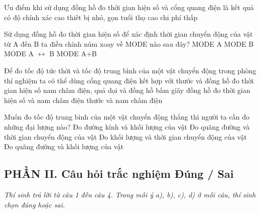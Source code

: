 \begin{ex} Ưu điểm khi sử dụng đồng hồ đo thời gian hiện số và cổng quang điện là
\choice
{\True kết quả có độ chính xác cao}
{thiết bị nhỏ, gọn}
{tuổi thọ cao}
{chi phí thấp}
\end{ex}

\begin{ex} Sử dụng đồng hồ đo thời gian hiện số để xác định thời gian chuyển động của vật từ A đến B ta điều chỉnh núm xoay về MODE nào sau đây?
\choice
{MODE A}
{MODE B}
{\True MODE A $\leftrightarrow$ B}
{MODE A+B}
\end{ex}

\begin{ex} Để đo tốc độ tức thời và tốc độ trung bình của một vật chuyển động trong phòng thí nghiệm ta có thể dùng cổng quang điện kết hợp với
\choice
{\True thước và đồng hồ đo thời gian hiện số}
{nam châm điện, quả dọi và đồng hồ bấm giây}
{đồng hồ đo thời gian hiện số và nam châm điện}
{thước và nam châm điện}
\end{ex}

\begin{ex} Muốn đo tốc độ trung bình của một vật chuyển động thẳng thì người ta cần đo những đại lượng nào?
\choice
{Đo đường kính và khối lượng của vật}
{\True Đo quãng đường và thời gian chuyển động của vật}
{Đo khối lượng và thời gian chuyển động của vật}
{Đo quãng đường và khối lượng của vật}
\end{ex}

\setcounter{ex}{0}
\subsection*{PHẦN II. Câu hỏi trắc nghiệm Đúng / Sai}
\textit{Thí sinh trả lời từ câu 1 đến câu 4. Trong mỗi ý a), b), c), d) ở mỗi câu, thí sinh chọn đúng hoặc sai.}

